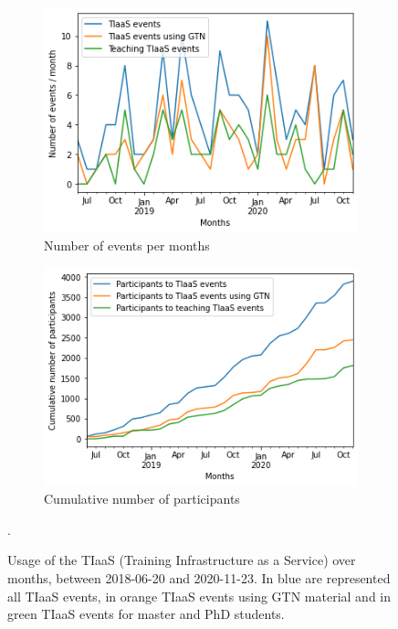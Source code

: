 \documentclass[10pt,letterpaper]{article}
\begin{document}
\begin{figure}[!ht]
    \centering
    \begin{subfigure}[b]{0.45\textwidth}
         \centering
         \includegraphics[width=\textwidth]{images/tiaas-events.png}
         \caption{Number of events per months}
         \label{fig:tiaas-events}
    \end{subfigure}
    \hfill
    \begin{subfigure}[b]{0.45\textwidth}
         \centering
         \includegraphics[width=\textwidth]{images/tiaas-participants.png}
         \caption{Cumulative number of participants}
         \label{fig:tiaas-participants}
    \end{subfigure}
	\caption{Usage of the TIaaS (Training Infrastructure as a Service) over months, between 2018-06-20 and 2020-11-23. In blue are represented all TIaaS events, in orange TIaaS events using GTN material and in green TIaaS events for master and PhD students.}. 
	\label{fig:tiaas}
\end{figure}
\end{document}
